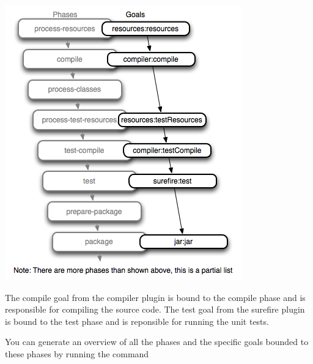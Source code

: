 \includegraphics[width=\textwidth]{./images/maven/maven-lifecycle-binding} 

The compile goal from the compiler plugin is bound to the compile phase and is responsible for compiling the source code. The test goal from the surefire plugin is bound to the test phase and is reponsible for running the unit tests.

You can generate an overview of all the phases and the specific goals bounded to these phases by running the command 

